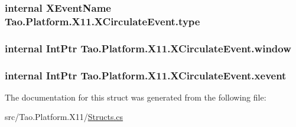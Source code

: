 \label{struct_tao_1_1_platform_1_1_x11_1_1_x_circulate_event_a6f3b3f1350d192b03c3af66badefef26}
\hypertarget{struct_tao_1_1_platform_1_1_x11_1_1_x_circulate_event_aea427c3d36e1b7a2d1d7a175fe97d91b}{
\subsubsection[{type}]{\setlength{\rightskip}{0pt plus 5cm}internal {\bf XEventName} {\bf Tao.Platform.X11.XCirculateEvent.type}}}
\label{struct_tao_1_1_platform_1_1_x11_1_1_x_circulate_event_aea427c3d36e1b7a2d1d7a175fe97d91b}
\hypertarget{struct_tao_1_1_platform_1_1_x11_1_1_x_circulate_event_aa5d6993f4cef39b9bbf93e70cbbea197}{
\subsubsection[{window}]{\setlength{\rightskip}{0pt plus 5cm}internal IntPtr {\bf Tao.Platform.X11.XCirculateEvent.window}}}
\label{struct_tao_1_1_platform_1_1_x11_1_1_x_circulate_event_aa5d6993f4cef39b9bbf93e70cbbea197}
\hypertarget{struct_tao_1_1_platform_1_1_x11_1_1_x_circulate_event_a02a4d1779273ecf9632d68b832e2597c}{
\subsubsection[{xevent}]{\setlength{\rightskip}{0pt plus 5cm}internal IntPtr {\bf Tao.Platform.X11.XCirculateEvent.xevent}}}
\label{struct_tao_1_1_platform_1_1_x11_1_1_x_circulate_event_a02a4d1779273ecf9632d68b832e2597c}


The documentation for this struct was generated from the following file:\begin{DoxyCompactItemize}
\item 
src/Tao.Platform.X11/\hyperlink{_structs_8cs}{Structs.cs}\end{DoxyCompactItemize}
